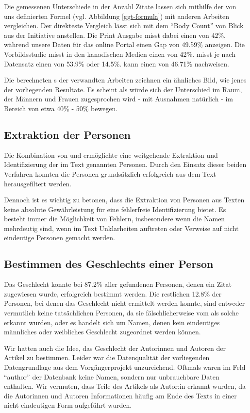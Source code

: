 Die gemessenen Unterschiede in der Anzahl Zitate lassen sich mithilfe der von uns definierten
 Formel (vgl. Abbildung \ref{ggt-formula}) mit anderen Arbeiten vergleichen.
Der direkteste Vergleich lässt sich mit dem \enquote{Body Count} von Blick aus der 
Initiative anstellen. Die Print Ausgabe misst dabei einen  von 42\%, während unsere
Daten für das online Portal einen Gap von 49.59\% anzeigen.
Die Vorbildsstudie  \cite{gender_gap_tracker} misst in den kanadischen Medien
einen  von 42\%.
 \cite{does-gender-matter-in-the-news}
misst je nach Datensatz einen  von 53.9\% oder 14.5\%.
 \cite{gender_bias_in_media} kann einen  von 46.71\% nachweisen.

Die berechneten s der verwandten Arbeiten zeichnen ein ähnliches Bild, wie jenes
der vorliegenden Resultate. Es scheint als würde sich der Unterschied im Raum, der Männern
und Frauen zugesprochen wird - mit Ausnahmen natürlich - im Bereich von etwa 40\% - 50\% bewegen.

\subsection{Extraktion der Personen}
Die Kombination von  und  ermöglichte eine weitgehende Extraktion und Identifizierung 
der im Text genannten Personen. 
Durch den Einsatz dieser beiden Verfahren konnten die Personen grundsätzlich erfolgreich aus dem Text herausgefiltert werden.

Dennoch ist es wichtig zu betonen, dass die Extraktion von Personen aus Texten keine absolute Gewährleistung für eine fehlerfreie Identifizierung bietet. 
Es besteht immer die Möglichkeit von Fehlern, insbesondere wenn die Namen mehrdeutig sind, wenn im 
Text Unklarheiten auftreten oder Verweise auf nicht eindeutige Personen gemacht werden.

\subsection{Bestimmen des Geschlechts einer Person}
Das Geschlecht konnte bei 87.2\% aller gefundenen Personen, denen ein Zitat zugewiesen wurde, erfolgreich bestimmt werden. 
Die restlichen 12.8\% der Personen, bei denen das Geschlecht nicht ermittelt werden konnte, sind entweder vermutlich keine 
tatsächlichen Personen, da sie fälschlicherweise vom  als solche erkannt wurden, oder es handelt sich um Namen, 
denen kein eindeutiges männliches oder weibliches Geschlecht zugeordnet werden können.

Wir hatten auch die Idee, das Geschlecht der Autorinnen und Autoren der Artikel zu bestimmen. 
Leider war die Datenqualität der vorliegenden Datengrundlage aus dem Vorgängerprojekt unzureichend. 
Oftmals waren im Feld \enquote{author} der Datenbank keine Namen, sondern nur unbrauchbare Daten enthalten.
Wir vermuten, dass Teile des Artikels als Autor:in erkannt wurden, 
da die Autorinnen und Autoren Informationen häufig am Ende des Texts in einer nicht eindeutigen Form aufgeführt wurden.
